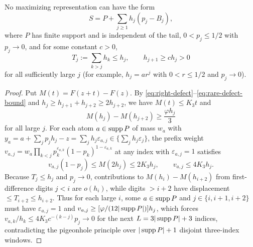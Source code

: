 \begin{theorem}\label{thm:nonoverlapping-tail}
No maximizing representation can have the form
\[
 S=P+\sum_{j\ge1}h_j(p_j-B_j),
\]
where $P$ has finite support and is independent of the tail, $0<p_j\le1/2$
with $p_j\to0$, and for some constant $c>0$,
\[
 T_j:=\sum_{k>j}h_k\le h_j,
 \qquad h_{j+1}\ge c h_j>0
\]
for all sufficiently large $j$ (for example, $h_j=ar^j$ with $0<r\le1/2$ and
$p_j\to0$).
\end{theorem}
\begin{proof}
Put $M(t)=F(z+t)-F(z)$. By \eqref{eq:right-defect}--\eqref{eq:rare-defect-bound}
and $h_j\ge h_{j+1}+h_{j+2}\ge2h_{j+2}$, we have $M(t)\le K_3t$ and
\begin{equation}\label{eq:rare-annulus}
                  M(h_j)-M(h_{j+2})\ge\frac{\varphi h_j}{3}
\end{equation}
for all large $j$. For each atom $a\in\operatorname{supp} P$ of mass $w_a$ with
$y_a=a+\sum_jp_jh_j-z=\sum_jh_j\varepsilon_{a,j}\in\{\sum_jh_j\varepsilon_j\}$,
the prefix weight $v_{a,j}=w_a\prod_{k<j}p_k^{\varepsilon_{a,k}}(1-p_k)^{1-\varepsilon_{a,k}}$
at any index with $\varepsilon_{a,j}=1$ satisfies
\begin{equation}\label{eq:rare-prefix-cap}
 v_{a,j}(1-p_j)\le M(2h_j)\le2K_3h_j,
                         \qquad v_{a,j}\le4K_3h_j.
\end{equation}
Because $T_j\le h_j$ and $p_j\to0$, contributions to $M(h_i)-M(h_{i+2})$ from
first-difference digits $j<i$ are $o(h_i)$, while digits $>i+2$ have
displacement $\le T_{i+2}\le h_{i+2}$. Thus for each large $i$, some
$a\in\operatorname{supp} P$ and $j\in\{i,i+1,i+2\}$ must have $\varepsilon_{a,j}=1$ and
$v_{a,j}\ge[\varphi/(12|\operatorname{supp} P|)]h_j$, which forces $v_{a,k}/h_k\le4K_3c^{-(k-j)}p_j\to0$
for the next $L=3|\operatorname{supp} P|+3$ indices, contradicting the pigeonhole principle
over $|\operatorname{supp} P|+1$ disjoint three-index windows.
\end{proof}
